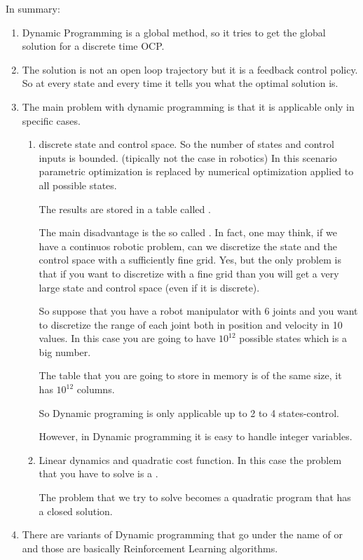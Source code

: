 In summary:
\begin{enumerate}
\item Dynamic Programming is a global method, so it tries to get the global solution for a discrete time OCP.
\item The solution is not an open loop trajectory but it is a feedback control policy. So at every state and every time it tells you what the optimal solution is.
\item The main problem with dynamic programming is that it is applicable only in specific cases.
	\begin{enumerate}
	\item discrete state and control space. So the number of states and control inputs is bounded. (tipically not the case in robotics)
	In this scenario parametric optimization is replaced by numerical optimization applied to all possible states.
	
	The results are stored in a table called .
	
	The main disadvantage is the so called . In fact, one may think, if we have a continuos robotic problem, can we discretize the state and the control space with a sufficiently fine grid. Yes, but the only problem is that if you want to discretize with a fine grid than you will get a very large state and control space (even if it is discrete).
	
	So suppose that you have a robot manipulator with 6 joints and you want to discretize the range of each joint both in position and velocity in 10 values. In this case you are going to have $10^{12}$ possible states which is a big number.
	
	The table that you are going to store in memory is of the same size, it has $10^{12}$ columns.
	
	So Dynamic programing is only applicable up to 2 to 4 states-control.
	
	However, in Dynamic programming it is easy to handle integer variables.
	\item Linear dynamics and quadratic cost function. In this case the problem that you have to solve is a .
	
	The problem that we try to solve becomes a quadratic program that has a closed solution.
	\end{enumerate}
\item There are variants of Dynamic programming that go under the name of  or  and those are basically Reinforcement Learning algorithms.
\end{enumerate}

